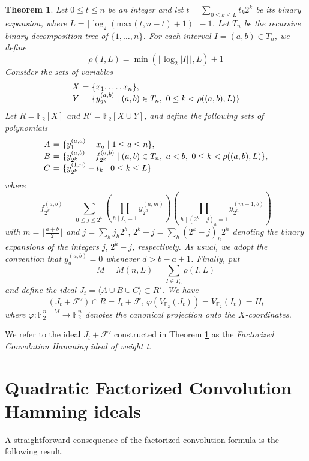\documentclass{amsart}
\newtheorem{theorem}{Theorem}[section]
\def\FF{{\mathbb F}}
\def\cF{{\mathcal{F}}}
\def\max{{\mathrm{max}}}
\begin{document}
\begin{theorem}
\label{main5}
Let $0 \leq t \leq n$ be an integer and let $t = \sum_{0\leq k\leq L} t_k 2^k$
be its binary expansion, where $L = \lceil\log_2( \max(t,n-t) + 1)\rceil - 1$.
Let $T_n$ be the recursive binary decomposition tree of $\{1,\ldots,n\}$.
For each interval $I = (a,b)\in T_n$, we define
\[
\rho(I,L) = \min(\lfloor \log_2 |I| \rfloor, L) + 1
\]
Consider the sets of variables
\[
\begin{array}{c@{\ }c@{\ }l}
X & = & \{x_1,\ldots,x_n\}, \\
Y & = & \{y_{2^k}^{(a,b)} \mid (a,b)\in T_n,\ 0\leq k < \rho((a,b),L)\}
\end{array}
\]
Let $R = \FF_2[X]$ and $R' = \FF_2[X \cup Y]$, and define the following
sets of polynomials
\[
\begin{array}{c@{\ }c@{\ }l}
A & = & \{ y_1^{(a,a)} - x_a \mid 1 \leq a \leq n \}, \\
B & = & \{ y_{2^k}^{(a,b)} - f_{2^k}^{(a,b)} \mid
(a,b)\in T_n,\ a < b,\ 0 \leq k < \rho((a,b),L) \}, \\
C & = & \{ y_{2^k}^{(1,n)} - t_k \mid 0 \leq k \leq L \}
\end{array}
\]
where
\[
f_{2^k}^{(a,b)} =
\sum_{0\leq j\leq 2^k}
( \prod_{h\mid j_h = 1} y_{2^h}^{(a,m)} )
( \prod_{h\mid (2^k - j)_h = 1} y_{2^h}^{(m+1,b)} )
\]
with $m = \lfloor \frac{a+b}{2} \rfloor$ and $j = \sum_h j_h 2^h,\,
2^k - j = \sum_h (2^k - j)_h 2^h$ denoting the binary expansions of the integers
$j,\, 2^k-j$, respectively.
As usual, we adopt the convention that $y_d^{(a,b)} = 0$ whenever $d > b-a+1$.
Finally, put
\[
M = M(n,L) = \sum_{I\in T_n} \rho(I,L)
\]
and define the ideal $J_t = \langle A \cup B \cup C \rangle \subset R'$.
We have
\[
(J_t + \cF')\cap R = I_t + \cF,\,
\varphi( V_{\FF_2}(J_t) ) = V_{\FF_2}(I_t) = H_t
\]
where $\varphi:\FF_2^{n + M} \to \FF_2^n$ denotes the canonical projection onto
the $X$-coordinates.
\end{theorem}

We refer to the ideal $J_t + \cF'$ constructed in Theorem \ref{main5} as the {\em Factorized
Convolution Hamming ideal of weight t}.


\section{Quadratic Factorized Convolution Hamming ideals}

A straightforward consequence of the factorized convolution formula is the following result.
\end{document}
